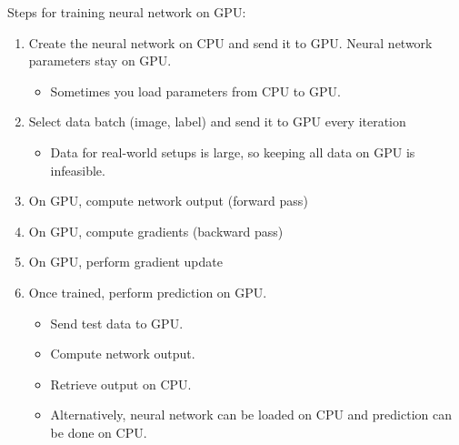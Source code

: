 \begin{concept}
    Steps for training neural network on GPU:

    \begin{enumerate}
        \item
        Create the neural network on CPU and send it to GPU. Neural network parameters stay on GPU.

        \begin{itemize}
            \item Sometimes you load parameters from CPU to GPU.
        \end{itemize}
        \item
        Select data batch (image, label) and send it to GPU every iteration

        \begin{itemize}
            \item Data for real-world setups is large, so keeping all data on GPU is infeasible.
        \end{itemize}
        \item On GPU, compute network output (forward pass)
        \item On GPU, compute gradients (backward pass)
        \item On GPU, perform gradient update
        \item
        Once trained, perform prediction on GPU.

        \begin{itemize}
            \item Send test data to GPU.
            \item Compute network output.
            \item Retrieve output on CPU.
            \item Alternatively, neural network can be loaded on CPU and prediction can be done on CPU.
        \end{itemize}
    \end{enumerate}
\end{concept}
